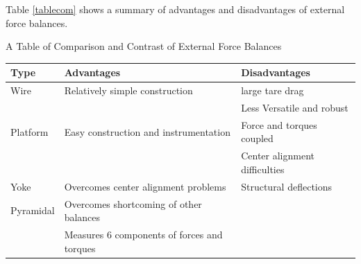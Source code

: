 Table \ref{tablecom} shows a summary of advantages and disadvantages of external force balances.
\clearpage
\begin{center}
	\begin{table}[H]
		\caption[Comparison of Force Balances]{A Table of Comparison and Contrast of External Force Balances}
		\label{tablecom}
	\end{table}
	\begin{tabular}{|l|l|l|}
		\hline
		\textbf{Type} & \textbf{Advantages}                         & \textbf{Disadvantages}        \\
		\hline
		Wire          & Relatively simple construction              & large tare drag               \\
		              &                                             & Less Versatile and robust     \\
		\hline
		Platform      & Easy construction and instrumentation        & Force and torques coupled     \\
		              &                                             & Center alignment difficulties \\
		\hline
		Yoke          & Overcomes center alignment problems         & Structural deflections        \\
		\hline
		Pyramidal     & Overcomes shortcoming of other balances     &                               \\
		              & Measures 6 components of forces and torques &                               \\
		\hline
	\end{tabular}
\end{center}

